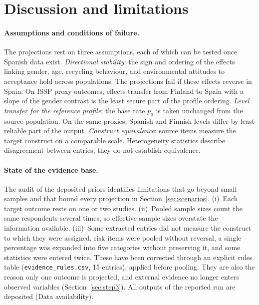 \section{Discussion and limitations}
\label{sec:limitations}

\paragraph{Assumptions and conditions of failure.}
The projections rest on three assumptions, each of which can be tested once
Spanish data exist. \emph{Directional stability}: the sign and ordering of the
effects linking gender, age, recycling behaviour, and environmental attitudes
to acceptance hold across populations. The projections fail if these effects
reverse in Spain. On ISSP proxy outcomes, effects transfer from Finland to
Spain with a slope of %
the gender contrast is the least secure part of the profile ordering.
\emph{Level transfer for the reference profile}: the base rate $p_0$ is taken
unchanged from the source population. On the same proxies, Spanish and Finnish
levels differ by %
least reliable part of the output.
\emph{Construct equivalence}: source items measure the target construct on a
comparable scale. Heterogeneity statistics describe disagreement between
entries; they do not establish equivalence.

\paragraph{State of the evidence base.}
The audit of the deposited priors identifies limitations that go beyond small
samples and that bound every projection in Section~\ref{sec:scenarios}.
(i)~Each target outcome rests on one or two studies. (ii)~Pooled sample sizes
count the same respondents several times, so effective sample sizes overstate
the information available. (iii)~Some extracted entries did not measure the construct to which they were
assigned, risk items were pooled without reversal, a single percentage was
expanded into five categories without preserving it, and some statistics were
entered twice. These have been corrected through an explicit rules table
(\texttt{evidence\_rules.csv}, 15 entries), applied before pooling. They are
also the reason only one outcome is projected, and external evidence no longer
enters observed variables (Section~\ref{sec:step3}). All outputs of the
reported run are deposited (Data availability).

